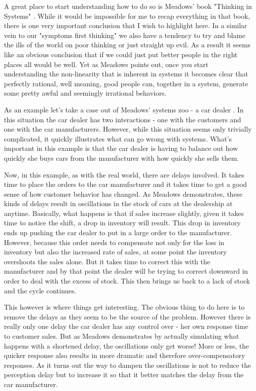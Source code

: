 \documentclass[11pt,a5paper]{book}
\begin{document}
A great place to start understanding how to do so is Meadows' book "Thinking in Systems" \cite{meadows}. While it would be impossible for me to recap everything in that book, there is one very important conclusion that I wish to highlight here. In a similar vein to our "symptoms first thinking" we also have a tendency to try and blame the ills of the world on poor thinking or just straight up evil. As a result it seems like an obvious conclusion that if we could just put better people in the right places all would be well. Yet as Meadows points out, once you start understanding the non-linearity that is inherent in systems it becomes clear that perfectly rational, well meaning, good people can, together in a system, generate some pretty awful and seemingly irrational behaviors. 
\newline 

As an example let's take a case out of Meadows' systems zoo - a car dealer \cite{meadows}. In this situation the car dealer has two interactions - one with the customers and one with the car manufacturers. However, while this situation seems only trivially complicated, it quickly illustrates what can go wrong with systems. What's important in this example is that the car dealer is having to balance out how quickly she buys cars from the manufacturer with how quickly she sells them.
\newline

Now, in this example, as with the real world, there are delays involved. It takes time to place the orders to the car manufacturer and it takes time to get a good sense of how customer behavior has changed. As Meadows demonstrates, these kinds of delays result in oscillations in the stock of cars at the dealership at anytime. Basically, what happens is that if sales increase slightly, given it takes time to notice the shift, a drop in inventory will result. This drop in inventory ends up pushing the car dealer to put in a large order to the manufacturer. However, because this order needs to compensate not only for the loss in inventory but also the increased rate of sales, at some point the inventory overshoots the sales alone. But it takes time to correct this with the manufacturer and by that point the dealer will be trying to correct downward in order to deal with the excess of stock. This then brings us back to a lack of stock and the cycle continues.
\newline

This however is where things get interesting. The obvious thing to do here is to remove the delays as they seem to be the source of the problem. However there is really only one delay the car dealer has any control over - her own response time to customer sales. But as Meadows demonstrates by actually simulating what happens with a shortened delay, the oscillations only get worse! More or less, the quicker response also results in more dramatic and therefore over-compensatory responses. As it turns out the way to dampen the oscillations is not to reduce the perception delay but to increase it so that it better matches the delay from the car manufacturer.
\newline
\end{document}

